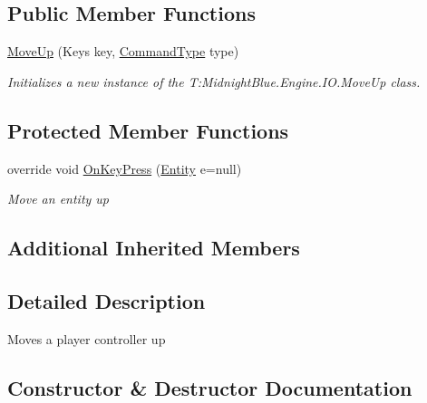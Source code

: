\subsection*{Public Member Functions}
\begin{DoxyCompactItemize}
\item 
\hyperlink{class_midnight_blue_1_1_engine_1_1_i_o_1_1_move_up_aee425dd8f11838b234085ec52fb5205f}{Move\+Up} (Keys key, \hyperlink{namespace_midnight_blue_1_1_engine_1_1_i_o_a8bc3f159399ecadd590f7df1b54354b0}{Command\+Type} type)
\begin{DoxyCompactList}\small\item\em Initializes a new instance of the T\+:\+Midnight\+Blue.\+Engine.\+I\+O.\+Move\+Up class. \end{DoxyCompactList}\end{DoxyCompactItemize}
\subsection*{Protected Member Functions}
\begin{DoxyCompactItemize}
\item 
override void \hyperlink{class_midnight_blue_1_1_engine_1_1_i_o_1_1_move_up_afd6d8930768f079467bf7872694151b3}{On\+Key\+Press} (\hyperlink{class_midnight_blue_1_1_engine_1_1_entity_component_1_1_entity}{Entity} e=null)
\begin{DoxyCompactList}\small\item\em Move an entity up \end{DoxyCompactList}\end{DoxyCompactItemize}
\subsection*{Additional Inherited Members}


\subsection{Detailed Description}
Moves a player controller up 



\subsection{Constructor \& Destructor Documentation}
\hypertarget{class_midnight_blue_1_1_engine_1_1_i_o_1_1_move_up_aee425dd8f11838b234085ec52fb5205f}{}\label{class_midnight_blue_1_1_engine_1_1_i_o_1_1_move_up_aee425dd8f11838b234085ec52fb5205f} 
